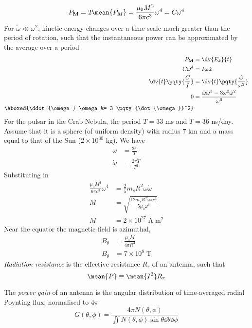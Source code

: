 \documentclass[12pt]{extarticle}
\begin{document}
\begin{outline}
\[            P_{\bf M} =2\mean{P_M} = \frac{\mu_0 M^2}{6\pi c^3}\omega^4 = C \omega^4
        \] 
        For \(\dot{\omega} \ll \omega^2\), kinetic energy changes over a time scale much greater than the period of rotation, such that the instantaneous power can be approximated by the average over a period \begin{align*}
            P_{\bf M} &= \dv{E_k}{t}\\
            C\omega^4&= I\omega \dot{\omega}\\
            \dv{t}\pqty{\frac{C}{I}}&= \dv{t}\pqty{\frac{\dot{\omega}}{\omega^3} }\\
            0&= \frac{\ddot{\omega}\omega^3 - 3\omega^2 \dot{\omega}^2}{\omega^6} \\
            \Aboxed{\ddot{\omega} \omega &= 3 \pqty{\dot{\omega}}^2}
        \end{align*}
        For the pulsar in the Crab Nebula, the period \(T = 33\) ms and \(\dot{T} = 36\) ns/day. Assume that it is a sphere (of uniform density) with radius \(7\) km and a mass equal to that of the Sun (\(2 \times 10^{30}\) kg). We have \begin{align*}
            \omega &= \frac{2\pi}{T}\\
            \dot{\omega} &= \frac{2\pi \dot{T}}{T^2}
        \end{align*}
        Substituting in 
        \begin{align*}
            \frac{\mu_0 M^2}{6\pi c^3}\omega^4 &=  \frac{2}{5} m_s R^2\omega \dot{\omega}\\
            M &=  \sqrt{\frac{12m_s R^2\dot{\omega} \pi c^3}{5\mu_0\omega^3}}\\
            M &= 2 \times 10^{27}\; \mathrm{A\; m^2}
        \end{align*}
        Near the equator the magnetic field is azimuthal, \begin{align*}
            B_\theta &= \frac{\mu_0 M}{4\pi R^3}\\
            B_\theta &= 7 \times 10^8\; \mathrm{T}
        \end{align*}
        \1 \emph{Radiation resistance} is the effective resistance \(R_r\) of an antenna, such that \[
            \mean{P} \equiv \mean{I^2} R_{r}
        \]

        The \emph{power gain} of an antenna is the angular distribution of time-averaged radial Poynting flux, normalised to \(4\pi\) \[
            G(\theta,\phi) = \frac{4\pi N(\theta,\phi)}{\iint N(\theta,\phi) \sin\theta\dd{\theta}\dd{\phi}} 
        \]      


\end{outline}
\end{document}
